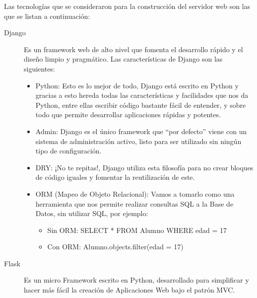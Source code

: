     Las tecnologías que se consideraron para la construcción del servidor web son las que se listan a continuación:
    \begin{description}
        \item[Django]  Es un framework web de alto nivel que fomenta el desarrollo rápido y el diseño limpio y pragmático.
        Las características de Django son las siguientes:
        \begin{itemize}
            \item Python: Esto es lo mejor de todo, Django está escrito en Python y gracias a esto hereda todas las características y facilidades que nos da Python, entre ellas escribir código bastante fácil de entender, y sobre todo que permite desarrollar aplicaciones rápidas y potentes.
            \item Admin: Django es el único framework que “por defecto” viene con un sistema de administración activo, listo para ser utilizado sin ningún tipo de configuración.
            \item DRY: ¡No te repitas!, Django utiliza esta filosofía para no crear bloques de código iguales y fomentar la reutilización de este.
            \item ORM (Mapeo de Objeto Relacional): Vamos a tomarlo como una herramienta que nos permite realizar consultas SQL a la Base de Datos, sin utilizar SQL, por ejemplo:
            \begin{itemize}
                \item Sin ORM:  SELECT * FROM Alumno WHERE edad = 17
                \item Con ORM: Alumno.objects.filter(edad = 17)
            \end{itemize}   
        \end{itemize}

        \item[Flask] Es un micro Framework escrito en Python, desarrollado para simplificar y hacer más fácil la creación de Aplicaciones Web bajo el patrón MVC.


\end{description}
